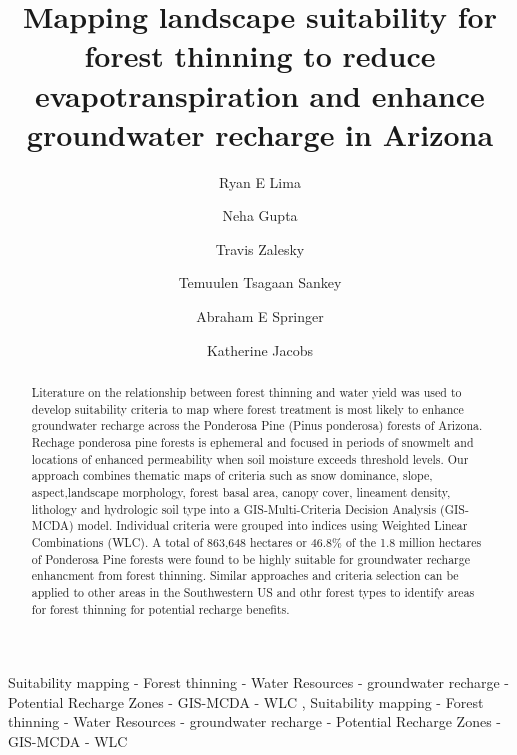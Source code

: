 \documentclass[
  number,
  preprint,
  3p,
  onecolumn]{elsarticle}
\begin{document}
\begin{frontmatter}
\title{Mapping landscape suitability for forest thinning to reduce
evapotranspiration and enhance groundwater recharge in Arizona}
\author[1]{Ryan E Lima%
%
}
\author[2]{Neha Gupta%
%
}

\author[2]{Travis Zalesky%
%
}

\author[1]{Temuulen Tsagaan Sankey%
%
}

\author[1]{Abraham E Springer%
%
}

\author[2]{Katherine Jacobs%
%
}









        
\begin{abstract}
Literature on the relationship between forest thinning and water yield
was used to develop suitability criteria to map where forest treatment
is most likely to enhance groundwater recharge across the Ponderosa Pine
(Pinus ponderosa) forests of Arizona. Rechage ponderosa pine forests is
ephemeral and focused in periods of snowmelt and locations of enhanced
permeability when soil moisture exceeds threshold levels. Our approach
combines thematic maps of criteria such as snow dominance, slope,
aspect,landscape morphology, forest basal area, canopy cover, lineament
density, lithology and hydrologic soil type into a GIS-Multi-Criteria
Decision Analysis (GIS-MCDA) model. Individual criteria were grouped
into indices using Weighted Linear Combinations (WLC). A total of
863,648 hectares or 46.8\% of the 1.8 million hectares of Ponderosa Pine
forests were found to be highly suitable for groundwater recharge
enhancment from forest thinning. Similar approaches and criteria
selection can be applied to other areas in the Southwestern US and othr
forest types to identify areas for forest thinning for potential
recharge benefits.
\end{abstract}





\begin{keyword}
    Suitability mapping - Forest thinning - Water Resources -
groundwater recharge - Potential Recharge Zones - GIS-MCDA - WLC \sep 
    Suitability mapping - Forest thinning - Water Resources -
groundwater recharge - Potential Recharge Zones - GIS-MCDA - WLC
\end{keyword}
\end{frontmatter}
    
\end{document}
